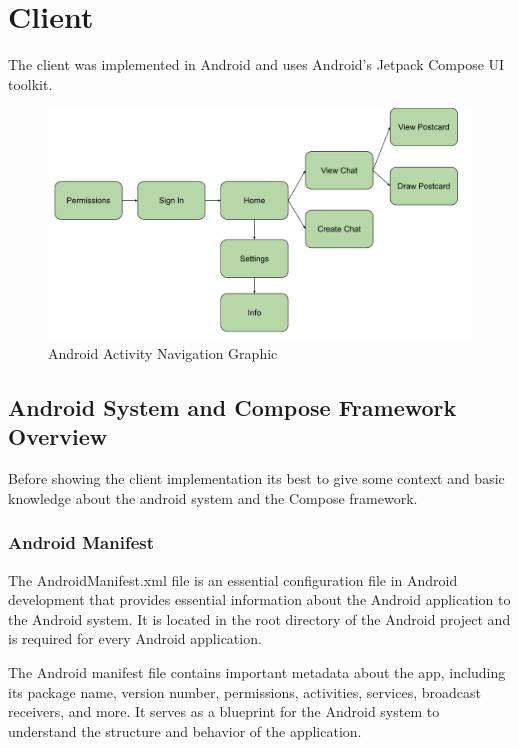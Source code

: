 \chapter{Client} 
\label{ch:Chapter6}
\vfill \minitoc \newpage

The client was implemented in Android and uses Android's Jetpack Compose UI toolkit.

\begin{figure}[!ht]
	\centering
	\includegraphics[trim={0cm 0cm 0 0cm}, width=1\textwidth]{./Chapter6/Figures/Android NavGraph}
	\caption{Android Activity Navigation Graphic}
	\label{fig:NavgGraph}
\end{figure}


\section{Android System and Compose Framework Overview}
Before showing the client implementation its best to give some context and basic knowledge about the android system and the Compose framework.

\subsection{Android Manifest}
The AndroidManifest.xml file is an essential configuration file in Android development that provides essential information about the Android application to the Android system. It is located in the root directory of the Android project and is required for every Android application.

The Android manifest file contains important metadata about the app, including its package name, version number, permissions, activities, services, broadcast receivers, and more. It serves as a blueprint for the Android system to understand the structure and behavior of the application.

